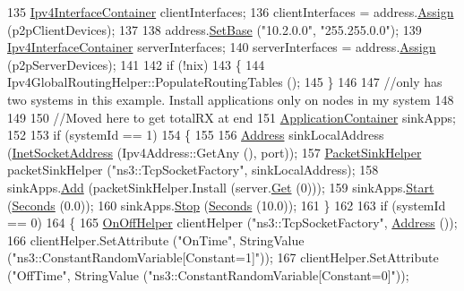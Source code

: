 \begin{DoxyCode}
135   \hyperlink{classns3_1_1Ipv4InterfaceContainer}{Ipv4InterfaceContainer} clientInterfaces;
136   clientInterfaces = address.\hyperlink{classns3_1_1Ipv4AddressHelper_af8e7f4a1a7e74c00014a1eac445a27af}{Assign} (p2pClientDevices);
137 
138   address.\hyperlink{classns3_1_1Ipv4AddressHelper_acf7b16dd25bac67e00f5e25f90a9a035}{SetBase} (\textcolor{stringliteral}{"10.2.0.0"}, \textcolor{stringliteral}{"255.255.0.0"});
139   \hyperlink{classns3_1_1Ipv4InterfaceContainer}{Ipv4InterfaceContainer} serverInterfaces;
140   serverInterfaces = address.\hyperlink{classns3_1_1Ipv4AddressHelper_af8e7f4a1a7e74c00014a1eac445a27af}{Assign} (p2pServerDevices);
141 
142   \textcolor{keywordflow}{if} (!nix)
143     \{
144       Ipv4GlobalRoutingHelper::PopulateRoutingTables ();
145     \}
146 
147   \textcolor{comment}{//only has two systems in this example.  Install applications only on nodes in my system}
148 
149 
150   \textcolor{comment}{//Moved here to get totalRX at end}
151   \hyperlink{classns3_1_1ApplicationContainer}{ApplicationContainer} sinkApps;
152 
153   \textcolor{keywordflow}{if} (systemId == 1)
154     \{
155 
156       \hyperlink{classns3_1_1Address}{Address} sinkLocalAddress (\hyperlink{classns3_1_1InetSocketAddress}{InetSocketAddress} (Ipv4Address::GetAny (), port));
157       \hyperlink{classns3_1_1PacketSinkHelper}{PacketSinkHelper} packetSinkHelper (\textcolor{stringliteral}{"ns3::TcpSocketFactory"}, sinkLocalAddress);
158       sinkApps.\hyperlink{classns3_1_1ApplicationContainer_ad09ab1a1ad5849d518d5f4c262e38152}{Add} (packetSinkHelper.Install (server.\hyperlink{classns3_1_1NodeContainer_a9ed96e2ecc22e0f5a3d4842eb9bf90bf}{Get} (0)));
159       sinkApps.\hyperlink{classns3_1_1ApplicationContainer_a8eff87926507020bbe3e1390358a54a7}{Start} (\hyperlink{group__timecivil_ga33c34b816f8ff6628e33d5c8e9713b9e}{Seconds} (0.0));
160       sinkApps.\hyperlink{classns3_1_1ApplicationContainer_adfc52f9aa4020c8714679b00bbb9ddb3}{Stop} (\hyperlink{group__timecivil_ga33c34b816f8ff6628e33d5c8e9713b9e}{Seconds} (10.0));
161     \}
162 
163   \textcolor{keywordflow}{if} (systemId == 0)
164     \{
165       \hyperlink{classns3_1_1OnOffHelper}{OnOffHelper} clientHelper (\textcolor{stringliteral}{"ns3::TcpSocketFactory"}, \hyperlink{classns3_1_1Address}{Address} ());
166       clientHelper.SetAttribute (\textcolor{stringliteral}{"OnTime"}, StringValue (\textcolor{stringliteral}{"ns3::ConstantRandomVariable[Constant=1]"}));
167       clientHelper.SetAttribute (\textcolor{stringliteral}{"OffTime"}, StringValue (\textcolor{stringliteral}{"ns3::ConstantRandomVariable[Constant=0]"}));

\end{DoxyCode}
